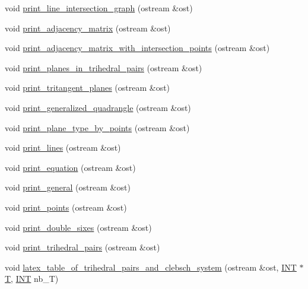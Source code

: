 \begin{DoxyCompactItemize}
\item 
void \mbox{\hyperlink{classsurface__object_a89500b9c84a04ba16f97c3f0f25f3f34}{print\+\_\+line\+\_\+intersection\+\_\+graph}} (ostream \&ost)
\item 
void \mbox{\hyperlink{classsurface__object_a559eff30b652887fdcfecb2f13f3718f}{print\+\_\+adjacency\+\_\+matrix}} (ostream \&ost)
\item 
void \mbox{\hyperlink{classsurface__object_a5bbd3a8c13107c326d8fda82374dbc4c}{print\+\_\+adjacency\+\_\+matrix\+\_\+with\+\_\+intersection\+\_\+points}} (ostream \&ost)
\item 
void \mbox{\hyperlink{classsurface__object_a0ef70b8d17e3add2cd9e8b95d7e56a28}{print\+\_\+planes\+\_\+in\+\_\+trihedral\+\_\+pairs}} (ostream \&ost)
\item 
void \mbox{\hyperlink{classsurface__object_adc569e1b86bec1e9eb1b13e08ae47c0d}{print\+\_\+tritangent\+\_\+planes}} (ostream \&ost)
\item 
void \mbox{\hyperlink{classsurface__object_ac2ed7e410aa63f30610284e9584c1a13}{print\+\_\+generalized\+\_\+quadrangle}} (ostream \&ost)
\item 
void \mbox{\hyperlink{classsurface__object_ad948559b08ec6d88a0138d943c4ecd3f}{print\+\_\+plane\+\_\+type\+\_\+by\+\_\+points}} (ostream \&ost)
\item 
void \mbox{\hyperlink{classsurface__object_a778d359240ca044debd3cca2d7f85762}{print\+\_\+lines}} (ostream \&ost)
\item 
void \mbox{\hyperlink{classsurface__object_a636657809582fe91c287bdf56c1b6cf3}{print\+\_\+equation}} (ostream \&ost)
\item 
void \mbox{\hyperlink{classsurface__object_ac8a03f56927e2db66b4012a17a2bb49f}{print\+\_\+general}} (ostream \&ost)
\item 
void \mbox{\hyperlink{classsurface__object_a80d7fdb3c014dcdad81ce942399f5770}{print\+\_\+points}} (ostream \&ost)
\item 
void \mbox{\hyperlink{classsurface__object_a96fc0de92fc676cd9ac857eb8dceba10}{print\+\_\+double\+\_\+sixes}} (ostream \&ost)
\item 
void \mbox{\hyperlink{classsurface__object_a5288bd5c7da32fc2a827c27f8e727486}{print\+\_\+trihedral\+\_\+pairs}} (ostream \&ost)
\item 
void \mbox{\hyperlink{classsurface__object_a174ac7ffea380b2c2593fbe540da38c4}{latex\+\_\+table\+\_\+of\+\_\+trihedral\+\_\+pairs\+\_\+and\+\_\+clebsch\+\_\+system}} (ostream \&ost, \mbox{\hyperlink{galois_8h_a09fddde158a3a20bd2dcadb609de11dc}{I\+NT}} $\ast$\mbox{\hyperlink{pentomino__5x5_8_c_a2b44a927c3e8a68f69f9f943c32c696d}{T}}, \mbox{\hyperlink{galois_8h_a09fddde158a3a20bd2dcadb609de11dc}{I\+NT}} nb\+\_\+T)

\end{DoxyCompactItemize}
